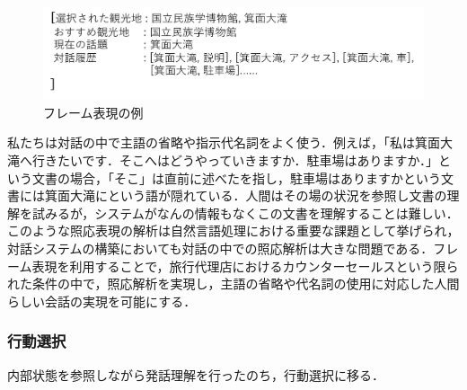 \begin{figure}[th]
    \centering
    \includegraphics[scale=0.5]{pic/frame.pdf}
    \caption{フレーム表現の例}
    \label{frame}
\end{figure}

私たちは対話の中で主語の省略や指示代名詞をよく使う．例えば，「私は箕面大滝へ行きたいです．そこへはどうやっていきますか．駐車場はありますか．」という文書の場合，「そこ」は直前に述べたを指し，駐車場はありますかという文書には箕面大滝にという語が隠れている．人間はその場の状況を参照し文書の理解を試みるが，システムがなんの情報もなくこの文書を理解することは難しい．このような照応表現の解析は自然言語処理における重要な課題として挙げられ\cite{shouo1996}，対話システムの構築においても対話の中での照応解析は大きな問題である\cite{taiwashouo2003}．フレーム表現を利用することで，旅行代理店におけるカウンターセールスという限られた条件の中で，照応解析を実現し，主語の省略や代名詞の使用に対応した人間らしい会話の実現を可能にする．

\subsubsection{行動選択}
内部状態を参照しながら発話理解を行ったのち，行動選択に移る．

